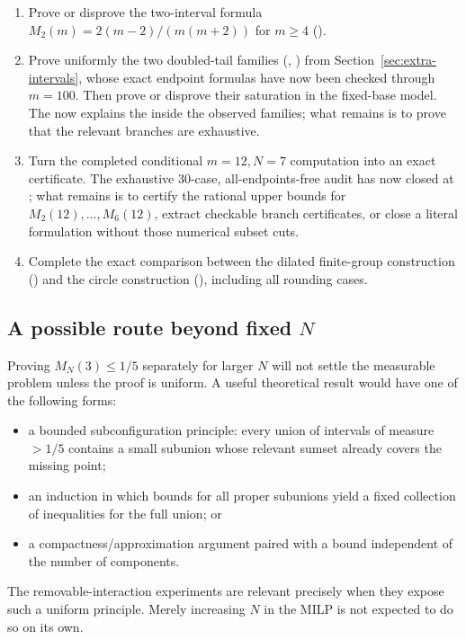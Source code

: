 \begin{enumerate}[resume]
    \item Prove or disprove the two-interval formula
    \(M_2(m)=2(m-2)/(m(m+2))\) for \(m\geq4\)
    ().
    \item Prove uniformly the two doubled-tail families
    (,
    ) from
    Section~\ref{sec:extra-intervals}, whose exact endpoint formulas have now
    been checked through \(m=100\).  Then prove or disprove their saturation
    in the fixed-base model.  The
     now explains the
     inside the observed families;
    what remains is to prove that the relevant branches are exhaustive.
    \item Turn the completed conditional \(m=12,N=7\) computation into an exact
    certificate.  The exhaustive 30-case, all-endpoints-free audit has now
    closed at ; what remains is to certify the rational upper bounds
    for \(M_2(12),\ldots,M_6(12)\), extract checkable branch certificates, or
    close a literal formulation without those numerical subset cuts.
    \item Complete the exact comparison between the dilated finite-group
    construction () and the
    circle construction (),
    including all rounding cases.
\end{enumerate}

\subsection{A possible route beyond fixed \texorpdfstring{$N$}{N}}

Proving \(M_N(3)\leq1/5\) separately for larger \(N\) will not settle the
measurable problem unless the proof is uniform.  A useful theoretical result
would have one of the following forms:
\begin{itemize}
    \item a bounded subconfiguration principle: every union of intervals of
          measure $>1/5$ contains a small subunion whose relevant sumset
          already covers the missing point;
    \item an induction in which bounds for all proper subunions yield a fixed
          collection of inequalities for the full union; or
    \item a compactness/approximation argument paired with a bound independent
          of the number of components.
\end{itemize}
The removable-interaction experiments are relevant precisely when they expose
such a uniform principle.  Merely increasing \(N\) in the MILP is not expected
to do so on its own.

